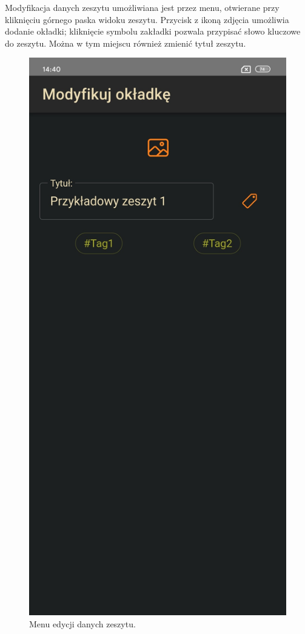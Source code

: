 Modyfikacja danych zeszytu umożliwiana jest przez menu, otwierane przy kliknięciu górnego paska widoku zeszytu.
Przycisk z ikoną zdjęcia umożliwia dodanie okładki; kliknięcie symbolu zakładki pozwala przypisać słowo kluczowe
do zeszytu. Można w tym miejscu również zmienić tytuł zeszytu.

\begin{figure}[H]
	\begin{center}
		\includegraphics[scale=0.2]{media/BookMenu.jpg}
	\end{center}
	\caption{Menu edycji danych zeszytu.}
	\label{rys:book-menu}
\end{figure}

